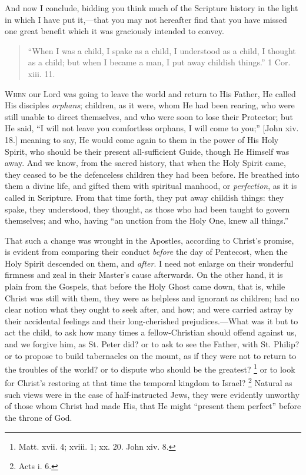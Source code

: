 And now I conclude, bidding you think much of the
Scripture history in the light in which I have put
it,—that you may not hereafter find that you have
missed one great benefit which it was graciously intended
to convey.


\begin{quote}

``When I was a child, I spake as a child, I
understood as a child, I thought as a child; but when
I became a man, I put away childish things.'' 1
Cor. xiii. 11.

\end{quote}

W\textsc{hen} our Lord was going to leave the world and return
to His Father, He called His disciples \emph{orphans};
children, as it were, whom He had been rearing, who were
still unable to direct themselves, and who were soon to
lose their Protector; but He said, ``I will not leave
you comfortless orphans, I will come to you;'' [John
xiv. 18.] meaning to say, He would come again to them in
the power of His Holy Spirit, who should be their present
all-sufficient Guide, though He Himself was away. And we
know, from the sacred history, that when the Holy Spirit
came, they ceased to be the defenceless children they had
been before. He breathed into them a divine life, and
gifted them with spiritual manhood, or \emph{perfection},
as it is called in Scripture. From that time forth, they
put away childish things: they spake, they understood,
they thought, as those who had been taught to govern
themselves; and who, having ``an unction from the
Holy One, knew all things.''

That such a change was wrought in the Apostles,
according to Christ's promise, is evident from comparing
their conduct \emph{before} the day of Pentecost, when
the Holy Spirit descended on them, and \emph{after}. I
need not enlarge on their wonderful firmness and zeal in
their Master's cause afterwards. On the other hand, it is
plain from the Gospels, that before the Holy Ghost came
down, that is, while Christ was still with them, they
were as helpless and ignorant as children; had no clear
notion what they ought to seek after, and how; and were
carried astray by their accidental feelings and their
long-cherished prejudices.—What was it but to act
the child, to ask how many times a fellow-Christian
should offend against us, and we forgive him, as St.
Peter did? or to ask to see the Father, with St. Philip?
or to propose to build tabernacles on the mount, as if
they were not to return to the troubles of the world? or
to dispute who should be the greatest? \footnote{Matt. xvii. 4; xviii. 1; xx. 20. John xiv. 8.} or to look for Christ's
restoring at that time the temporal kingdom to Israel? \footnote{Acts i. 6.} Natural as such views were in the case of
half-instructed Jews, they were evidently unworthy of
those whom Christ had made His, that He might
``present them perfect'' before the throne of
God.

